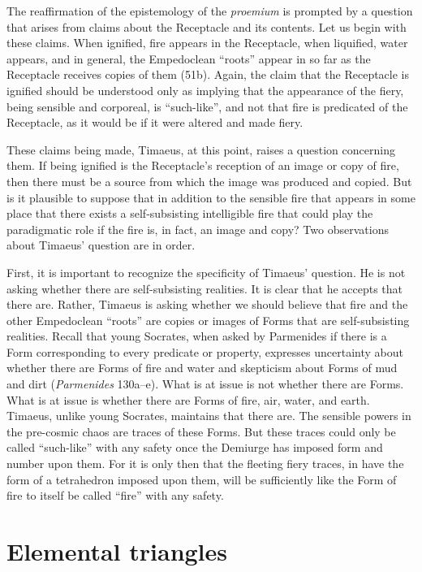 The reaffirmation of the epistemology of the \emph{proemium} is prompted by a question that arises from claims about the Receptacle and its contents. Let us begin with these claims. When ignified, fire appears in the Receptacle, when liquified, water appears, and in general, the Empedoclean ``roots'' appear in so far as the Receptacle receives copies of them (51b). Again, the claim that the Receptacle is ignified should be understood only as implying that the appearance of the fiery, being sensible and corporeal, is ``such-like'', and not that fire is predicated of the Receptacle, as it would be if it were altered and made fiery.

These claims being made, Timaeus, at this point, raises a question concerning them. If being ignified is the Receptacle's reception of an image or copy of fire, then there must be a source from which the image was produced and copied. But is it plausible to suppose that in addition to the sensible fire that appears in some place that there exists a self-subsisting intelligible fire that could play the paradigmatic role if the fire is, in fact, an image and copy? Two observations about Timaeus' question are in order.

First, it is important to recognize the specificity of Timaeus' question. He is not asking whether there are self-subsisting realities. It is clear that he accepts that there are. Rather, Timaeus is asking whether we should believe that fire and the other Empedoclean ``roots'' are copies or images of Forms that are self-subsisting realities. Recall that young Socrates, when asked by Parmenides if there is a Form corresponding to every predicate or property, expresses uncertainty about whether there are Forms of fire and water and skepticism about Forms of mud and dirt (\emph{Parmenides} 130a--e). What is at issue is not whether there are Forms. What is at issue is whether there are Forms of fire, air, water, and earth. Timaeus, unlike young Socrates, maintains that there are. The sensible powers in the pre-cosmic chaos are traces of these Forms. But these traces could only be called ``such-like'' with any safety once the Demiurge has imposed form and number upon them. For it is only then that the fleeting fiery traces, in have the form of a tetrahedron imposed upon them, will be sufficiently like the Form of fire to itself be called ``fire'' with any safety.


\section{Elemental triangles} %
\label{sec:elemental_triangles}



